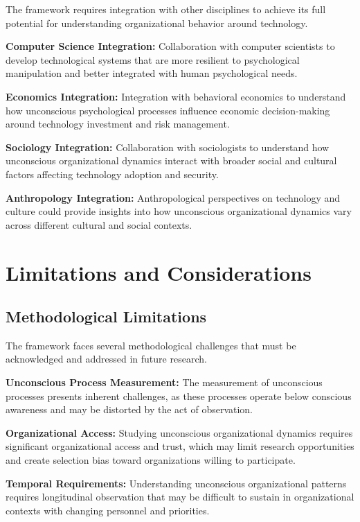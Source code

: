 \documentclass[10pt, twocolumn]{article}
\begin{document}
The framework requires integration with other disciplines to achieve its full potential for understanding organizational behavior around technology.

\textbf{Computer Science Integration:} Collaboration with computer scientists to develop technological systems that are more resilient to psychological manipulation and better integrated with human psychological needs.

\textbf{Economics Integration:} Integration with behavioral economics to understand how unconscious psychological processes influence economic decision-making around technology investment and risk management.

\textbf{Sociology Integration:} Collaboration with sociologists to understand how unconscious organizational dynamics interact with broader social and cultural factors affecting technology adoption and security.

\textbf{Anthropology Integration:} Anthropological perspectives on technology and culture could provide insights into how unconscious organizational dynamics vary across different cultural and social contexts.

\section{Limitations and Considerations}

\subsection{Methodological Limitations}

The framework faces several methodological challenges that must be acknowledged and addressed in future research.

\textbf{Unconscious Process Measurement:} The measurement of unconscious processes presents inherent challenges, as these processes operate below conscious awareness and may be distorted by the act of observation.

\textbf{Organizational Access:} Studying unconscious organizational dynamics requires significant organizational access and trust, which may limit research opportunities and create selection bias toward organizations willing to participate.

\textbf{Temporal Requirements:} Understanding unconscious organizational patterns requires longitudinal observation that may be difficult to sustain in organizational contexts with changing personnel and priorities.
\end{document}
